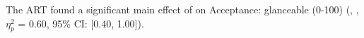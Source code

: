 The ART found a significant main effect of \Phase on Acceptance: glanceable (0-100) (, , $\eta_{p}^{2}$ = 0.60, 95\% CI: [0.40, 1.00]). 
